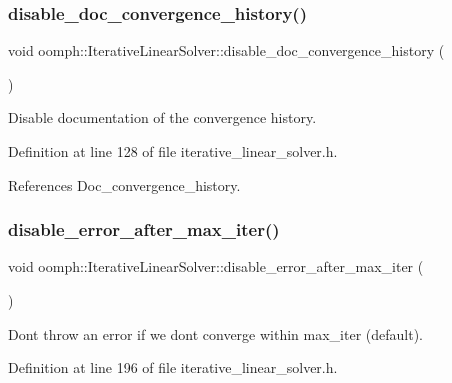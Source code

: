 \subsubsection{\texorpdfstring{disable\+\_\+doc\+\_\+convergence\+\_\+history()}{disable\_doc\_convergence\_history()}}
{\footnotesize\ttfamily void oomph\+::\+Iterative\+Linear\+Solver\+::disable\+\_\+doc\+\_\+convergence\+\_\+history (\begin{DoxyParamCaption}{ }\end{DoxyParamCaption})\hspace{0.3cm}{\ttfamily [inline]}}



Disable documentation of the convergence history. 



Definition at line 128 of file iterative\+\_\+linear\+\_\+solver.\+h.



References Doc\+\_\+convergence\+\_\+history.

\mbox{\label{classoomph_1_1IterativeLinearSolver_a4b6ee927fcefefee7271798a6ed6f5af}} 
\subsubsection{\texorpdfstring{disable\+\_\+error\+\_\+after\+\_\+max\+\_\+iter()}{disable\_error\_after\_max\_iter()}}
{\footnotesize\ttfamily void oomph\+::\+Iterative\+Linear\+Solver\+::disable\+\_\+error\+\_\+after\+\_\+max\+\_\+iter (\begin{DoxyParamCaption}{ }\end{DoxyParamCaption})\hspace{0.3cm}{\ttfamily [inline]}}



Don\textquotesingle{}t throw an error if we don\textquotesingle{}t converge within max\+\_\+iter (default). 



Definition at line 196 of file iterative\+\_\+linear\+\_\+solver.\+h.



